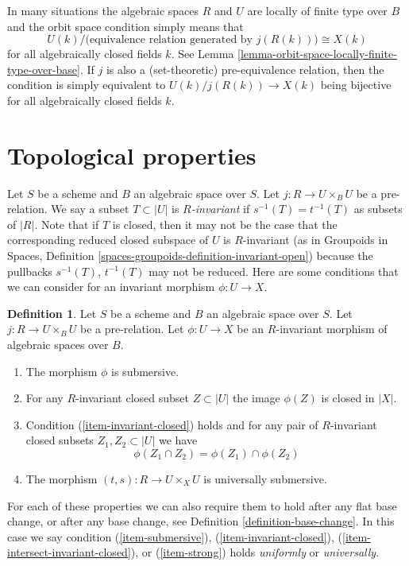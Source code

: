 \documentclass{stacks-project}
\theoremstyle{plain}
\theoremstyle{definition}
\newtheorem{definition}[subsection]{Definition}
\theoremstyle{remark}
\numberwithin{equation}{subsection}
\begin{document}
\noindent
In many situations the algebraic spaces $R$ and $U$ are locally of finite type
over $B$ and the orbit space condition simply means that
$$
U(k)/\big(\text{equivalence relation generated by }j(R(k))\big)
\cong
X(k)
$$
for all algebraically closed fields $k$. See
Lemma \ref{lemma-orbit-space-locally-finite-type-over-base}.
If $j$ is also a (set-theoretic) pre-equivalence relation, then the condition
is simply equivalent to $U(k)/j(R(k)) \to X(k)$ being bijective for all
algebraically closed fields $k$.









\section{Topological properties}
\label{section-topological}

\noindent
Let $S$ be a scheme and $B$ an algebraic space over $S$.
Let $j : R \to U \times_B U$ be a pre-relation.
We say a subset $T \subset |U|$ is {\it $R$-invariant} if
$s^{-1}(T) = t^{-1}(T)$ as subsets of $|R|$.
Note that if $T$ is closed, then it may not be the case that
the corresponding reduced closed subspace of $U$ is $R$-invariant
(as in
Groupoids in Spaces, Definition
\ref{spaces-groupoids-definition-invariant-open})
because the pullbacks $s^{-1}(T)$, $t^{-1}(T)$ may not be reduced.
Here are some conditions that we can consider for an
invariant morphism $\phi : U \to X$.

\begin{definition}
\label{definition-topological}
Let $S$ be a scheme and $B$ an algebraic space over $S$.
Let $j : R \to U \times_B U$ be a pre-relation.
Let $\phi : U \to X$ be an $R$-invariant morphism of algebraic spaces over $B$.
\begin{enumerate}
\item
\label{item-submersive}
The morphism $\phi$ is submersive.
\item
\label{item-invariant-closed}
For any $R$-invariant closed subset $Z \subset |U|$ the image
$\phi(Z)$ is closed in $|X|$.
\item
\label{item-intersect-invariant-closed}
Condition (\ref{item-invariant-closed}) holds and for any pair of
$R$-invariant closed subsets $Z_1, Z_2 \subset |U|$ we have
$$
\phi(Z_1 \cap Z_2) = \phi(Z_1) \cap \phi(Z_2)
$$
\item The morphism $(t, s) : R \to U \times_X U$ is universally submersive.
\label{item-strong}
\end{enumerate}
For each of these properties we can also require them to hold after any
flat base change, or after any base change, see
Definition \ref{definition-base-change}. In this case we say condition
(\ref{item-submersive}),
(\ref{item-invariant-closed}),
(\ref{item-intersect-invariant-closed}), or
(\ref{item-strong}) holds {\it uniformly} or {\it universally}.
\end{definition}
\end{document}
